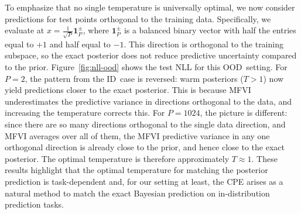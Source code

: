 \documentclass{article}
\theoremstyle{plain}
\theoremstyle{definition}
\theoremstyle{remark}
\theoremstyle{plain}
\begin{document}
To emphasize that no single temperature is universally optimal, we now consider predictions for test points orthogonal to the training data. Specifically, we evaluate at $x = \frac{1}{\sqrt{P}} \mathbf{1}_P^{\pm}$, where $\mathbf{1}_P^{\pm}$ is a balanced binary vector with half the entries equal to $+1$ and half equal to $-1$. This direction is orthogonal to the training subspace, so the exact posterior does not reduce predictive uncertainty compared to the prior. Figure~\ref{fig:nll-ood} shows the test NLL for this OOD\ setting. For $P = 2$, the pattern from the ID\ case is reversed: warm posteriors ($T > 1$) now yield predictions closer to the exact posterior. This is because MFVI underestimates the predictive variance in directions orthogonal to the data, and increasing the temperature corrects this. For $P = 1024$, the picture is different: since there are so many directions orthogonal to the single data direction, and MFVI averages over all of them, the MFVI predictive variance in any one orthogonal direction is already close to the prior, and hence close to the exact posterior. The optimal temperature is therefore approximately $T \approx 1$. These results highlight that the optimal temperature for matching the posterior prediction is task-dependent and, for our setting at least, the  CPE arises as a natural method to match the exact Bayesian prediction on in-distribution prediction tasks.
\end{document}
